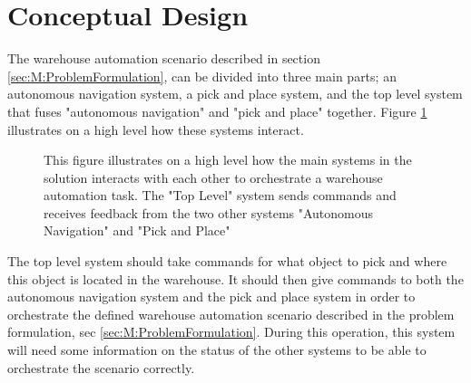 

\section{Conceptual Design}\label{sec:M:ConceptualDesign}
The warehouse automation scenario described in section \ref{sec:M:ProblemFormulation}, can be divided into three main parts; an autonomous navigation system, a pick and place system, and the top level system that fuses "autonomous navigation" and "pick and place" together. Figure \ref{fig:M:CD:topLevelMethod} illustrates on a high level how these systems interact.

\begin{figure}[htp]
    \fontsize{9}{14}\selectfont
    \centering
    
    \caption{This figure illustrates on a high level how the main systems in the solution interacts with each other to orchestrate a warehouse automation task. The "Top Level" system sends commands and receives feedback from the two other systems "Autonomous Navigation" and "Pick and Place"}
    \label{fig:M:CD:topLevelMethod}
\end{figure}

The top level system should take commands for what object to pick and where this object is located in the warehouse. It should then give commands to both the autonomous navigation system and the pick and place system in order to orchestrate the defined warehouse automation scenario described in the problem formulation, sec \ref{sec:M:ProblemFormulation}. During this operation, this system will need some information on the status of the other systems to be able to orchestrate the scenario correctly.

